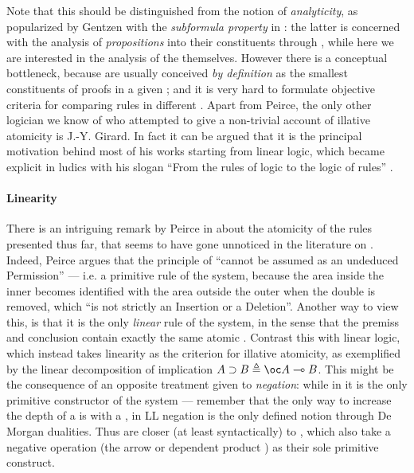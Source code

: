 \begin{scope}
Note that this should be distinguished from the notion of \emph{analyticity}, as
popularized by Gentzen with the \emph{subformula property} in : the latter is concerned with the analysis of \emph{propositions} into
their constituents through , while here we are interested in
the analysis of the  themselves. However there is a conceptual bottleneck, because
 are usually conceived \emph{by definition} as the smallest
constituents of proofs in a given ; and it is very hard to
formulate objective criteria for comparing rules in different . Apart from Peirce, the only other logician we know of who attempted to
give a non-trivial account of illative atomicity is J.-Y. Girard. In fact it can
be argued that it is the principal motivation behind most of his works starting
from linear logic, which became explicit in ludics with his slogan ``From the
rules of logic to the logic of rules'' \cite{girard_locus_2001}.

\paragraph{Linearity}

There is an intriguing remark by Peirce in
\cite[pp.~536--537]{peirce_prolegomena_1906} about the atomicity of the rules
presented thus far, that seems to have gone unnoticed in the literature on .
Indeed, Peirce argues that the principle of  ``cannot be
assumed as an undeduced Permission'' --- i.e. a primitive rule of the system,
because the area inside the inner  becomes identified with the area outside
the outer  when the double  is removed, which ``is not strictly an
Insertion or a Deletion''. Another way to view this, is that it is the only
\emph{linear} rule of the system, in the sense that the premiss and conclusion
contain exactly the same atomic . Contrast this with linear logic, which
instead takes linearity as the criterion for illative atomicity, as exemplified
by the linear decomposition of implication $A \limp B \defeq \oc A \multimap B$.
This might be the consequence of an opposite treatment given to \emph{negation}:
while in  it is the only primitive constructor of the system --- remember that
the only way to increase the depth of a  is with a , in LL negation is
the only defined notion through De Morgan dualities. Thus  are closer (at
least syntactically) to \emph{}, which also take a negative
operation (the arrow or dependent product ) as their sole primitive
construct.


\end{scope}
